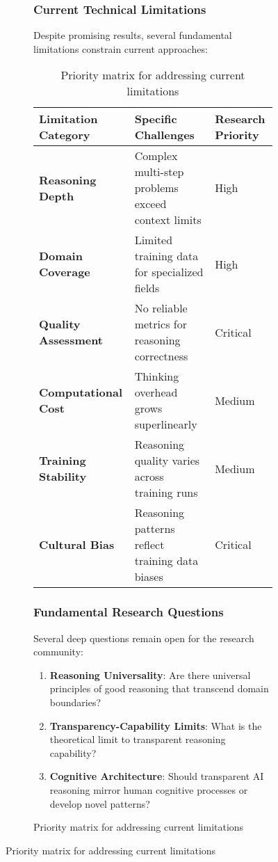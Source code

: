 \begin{figure}[H]
\begin{table}[H]
\begin{figure}[H]
\begin{table}[H]
\begin{table}[H]
\subsubsection{Current Technical Limitations}

Despite promising results, several fundamental limitations constrain current approaches:

\begin{table}[H]
\centering
\begin{tabular}{lp{5cm}p{4cm}}
\toprule
Limitation Category & Specific Challenges & Research Priority \\
\midrule
\textbf{Reasoning Depth} & Complex multi-step problems exceed context limits & High \\
\textbf{Domain Coverage} & Limited training data for specialized fields & High \\
\textbf{Quality Assessment} & No reliable metrics for reasoning correctness & Critical \\
\textbf{Computational Cost} & Thinking overhead grows superlinearly & Medium \\
\textbf{Training Stability} & Reasoning quality varies across training runs & Medium \\
\textbf{Cultural Bias} & Reasoning patterns reflect training data biases & Critical \\
\bottomrule
\end{tabular}
\caption{Priority matrix for addressing current limitations}
\label{tab:limitations-priority}
\end{table}

\subsubsection{Fundamental Research Questions}

Several deep questions remain open for the research community:

\begin{enumerate}
    \item \textbf{Reasoning Universality}: Are there universal principles of good reasoning that transcend domain boundaries?
    
    \item \textbf{Transparency-Capability Limits}: What is the theoretical limit to transparent reasoning capability?
    
    \item \textbf{Cognitive Architecture}: Should transparent AI reasoning mirror human cognitive processes or develop novel patterns?
    

\end{enumerate}
\end{table}
\end{table}
\end{figure}
\end{table}
\end{figure}
